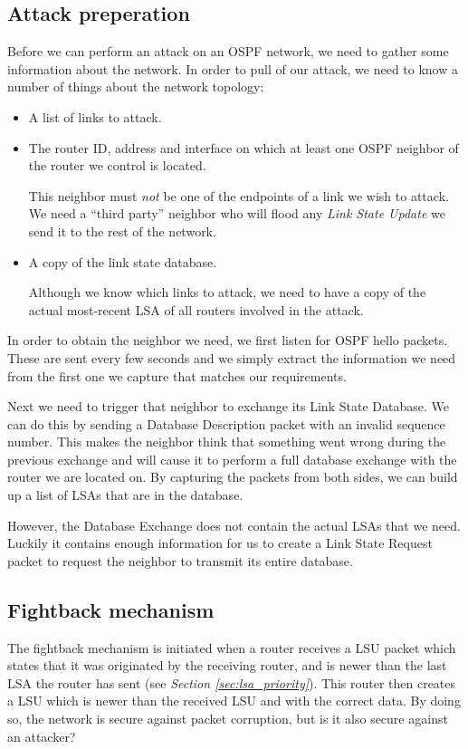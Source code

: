 \documentclass[11pt,a4paper,oneside]{article}
\newcommand{\lsubsection}[2]{\subsection{#1}\label{sec:#2}}
\begin{document}
    \lsubsection{Attack preperation}{attack_prep}
    Before we can perform an attack on an OSPF network, we need to gather some information about the network.
    In order to pull of our attack, we need to know a number of things about the network topology:
    \begin{itemize}
        \item A list of links to attack.
        \item The router ID, address and interface on which at least one OSPF neighbor of the router we control is located.

        This neighbor must \textit{not} be one of the endpoints of a link we wish to attack.
        We need a ``third party'' neighbor who will flood any \textit{Link State Update} we send it to the rest of the network.
        \item A copy of the link state database.

        Although we know which links to attack, we need to have a copy of the actual most-recent LSA of all routers involved in the attack.
    \end{itemize}

    In order to obtain the neighbor we need, we first listen for OSPF hello packets.
    These are sent every few seconds and we simply extract the information we need from the first one we capture that matches our requirements.

    Next we need to trigger that neighbor to exchange its Link State Database.
    We can do this by sending a Database Description packet with an invalid sequence number.
    This makes the neighbor think that something went wrong during the previous exchange and will cause it to perform a full database exchange with the router we are located on.
    By capturing the packets from both sides, we can build up a list of LSAs that are in the database.

    However, the Database Exchange does not contain the actual LSAs that we need.
    Luckily it contains enough information for us to create a Link State Request packet to request the neighbor to transmit its entire database.

    \lsubsection{Fightback mechanism}{fightback}
    The fightback mechanism is initiated when a router receives a LSU packet which states that it was originated by the receiving router, and is newer than the last LSA the router has sent (see \textit{Section \ref{sec:lsa_priority}}).
    This router then creates a LSU which is newer than the received LSU and with the correct data.
    By doing so, the network is secure against packet corruption, but is it also secure against an attacker?
\end{document}
